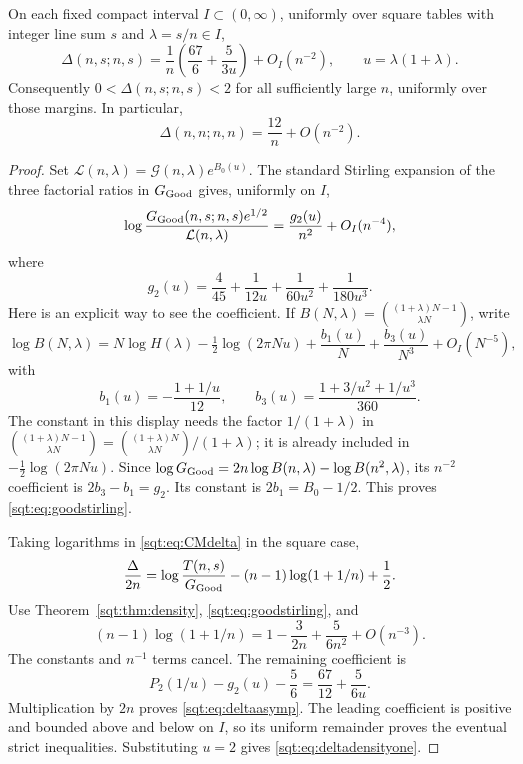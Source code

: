 \begin{corollary}\label{sqt:cor:delta}
On each fixed compact interval $I\subset(0,\infty)$, uniformly over square tables with integer line sum $s$ and $\lambda=s/n\in I$,
\begin{equation}\label{sqt:eq:deltaasymp}
\Delta(n,s;n,s)=\frac1n\left(\frac{67}{6}+\frac5{3u}\right)+O_I(n^{-2}),
\qquad u=\lambda(1+\lambda).
\end{equation}
Consequently $0<\Delta(n,s;n,s)<2$ for all sufficiently large $n$, uniformly over those margins. In particular,
\begin{equation}\label{sqt:eq:deltadensityone}
\Delta(n,n;n,n)=\frac{12}{n}+O(n^{-2}).
\end{equation}
\end{corollary}
\begin{proof}
Set $\mathcal L(n,\lambda)=\mathcal G(n,\lambda)e^{B_0(u)}$. The standard Stirling expansion of the three factorial ratios in $G_{\rm Good}$ gives, uniformly on $I$,
\begin{equation}\label{sqt:eq:goodstirling}
\log\frac{G_{\rm Good}(n,s;n,s)e^{1/2}}{\mathcal L(n,\lambda)}
 =\frac{g_2(u)}{n^2}+O_I(n^{-4}),
\end{equation}
where
\begin{equation}\label{sqt:eq:g2}
g_2(u)=\frac4{45}+\frac1{12u}+\frac1{60u^2}+\frac1{180u^3}.
\end{equation}
Here is an explicit way to see the coefficient. If
$B(N,\lambda)=\binom{(1+\lambda)N-1}{\lambda N}$, write
\[
\log B(N,\lambda)=N\log H(\lambda)-\tfrac12\log(2\pi N u)
 +\frac{b_1(u)}N+\frac{b_3(u)}{N^3}+O_I(N^{-5}),
\]
with
\[
b_1(u)=-\frac{1+1/u}{12},\qquad
b_3(u)=\frac{1+3/u^2+1/u^3}{360}.
\]
The constant in this display needs the factor $1/(1+\lambda)$ in
$\binom{(1+\lambda)N-1}{\lambda N}=\binom{(1+\lambda)N}{\lambda N}/(1+\lambda)$; it is already included in $-\tfrac12\log(2\pi N u)$. Since
$\log G_{\rm Good}=2n\log B(n,\lambda)-\log B(n^2,\lambda)$,
its $n^{-2}$ coefficient is $2b_3-b_1=g_2$. Its constant is $2b_1=B_0-1/2$. This proves \eqref{sqt:eq:goodstirling}.

Taking logarithms in \eqref{sqt:eq:CMdelta} in the square case,
\[
\frac{\Delta}{2n}=\log\frac{T(n,s)}{G_{\rm Good}}-(n-1)\log(1+1/n)+\frac12.
\]
Use Theorem~\ref{sqt:thm:density}, \eqref{sqt:eq:goodstirling}, and
\[
(n-1)\log(1+1/n)=1-\frac{3}{2n}+\frac5{6n^2}+O(n^{-3}).
\]
The constants and $n^{-1}$ terms cancel. The remaining coefficient is
\[
P_2(1/u)-g_2(u)-\frac56=\frac{67}{12}+\frac5{6u}.
\]
Multiplication by $2n$ proves \eqref{sqt:eq:deltaasymp}. The leading coefficient is positive and bounded above and below on $I$, so its uniform remainder proves the eventual strict inequalities. Substituting $u=2$ gives \eqref{sqt:eq:deltadensityone}.
\end{proof}

